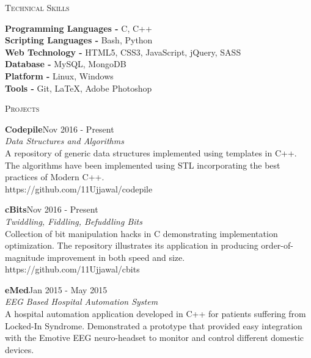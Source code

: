 \documentclass[a4paper, 11pt]{article}
\begin{document}
\begin{minipage}[t]{0.15\textwidth}
	\small \textsc{Technical Skills}
\end{minipage}
\hfill
\begin{minipage}[t]{0.80\textwidth}
	\noindent \textbf{Programming Languages - }C, C++\\
	\noindent \textbf{Scripting Languages - }Bash, Python\\
	\noindent \textbf{Web Technology - }HTML5, CSS3, JavaScript, jQuery, SASS\\
	\noindent \textbf{Database - }MySQL, MongoDB\\
	\noindent \textbf{Platform - }Linux, Windows\\
	\noindent \textbf{Tools - }Git, \LaTeX, Adobe Photoshop
	
\end{minipage}

\vspace{5mm}

\begin{minipage}[t]{0.15\textwidth}
	\small \textsc{Projects}
\end{minipage}
\hfill
\begin{minipage}[t]{0.80\textwidth}
	\noindent \textbf{Codepile}\hfill {\scriptsize \textrm{Nov 2016 - Present}}\\
	{
	\small \textit{Data Structures and Algorithms}\\
	A repository of generic data structures implemented using templates in C++. The algorithms have been implemented using STL incorporating the best practices of Modern C++.\\
	\footnotesize https://github.com/11Ujjawal/codepile\\
	}
	
	{
	\noindent \textbf{cBits}\hfill {\scriptsize \textrm{Nov 2016 - Present}}\\
	\small \textit{Twiddling, Fiddling, Befuddling Bits}\\
	Collection of bit manipulation hacks in C demonstrating implementation optimization. The repository illustrates its application in producing order-of-magnitude improvement in both speed and size.\\
	\footnotesize https://github.com/11Ujjawal/cbits\\
	}
	
	\noindent \textbf{eMed}\hfill {\scriptsize \textrm{Jan 2015 - May 2015}}\\
	\small \textit{ EEG Based Hospital Automation System}\\
	A hospital automation application developed in C++ for patients suffering from Locked-In Syndrome. Demonstrated a prototype that provided easy integration with the Emotive EEG neuro-headset to monitor and control different domestic devices.
	
\end{minipage}
\end{document}
